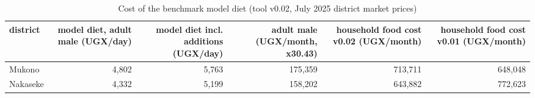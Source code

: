 \begin{table}[htbp]
\centering
\caption{Cost of the benchmark model diet (tool v0.02, July 2025 district market prices)}
\label{tab:model_diet_cost_v002}
\begin{tabular}{lrrrrr}
\toprule
district & model diet, adult male (UGX/day) & model diet incl. additions (UGX/day) & adult male (UGX/month, x30.43) & household food cost v0.02 (UGX/month) & household food cost v0.01 (UGX/month) \\
\midrule
Mukono & 4,802 & 5,763 & 175,359 & 713,711 & 648,048 \\
Nakaseke & 4,332 & 5,199 & 158,202 & 643,882 & 772,623 \\
\bottomrule
\end{tabular}
\end{table}
